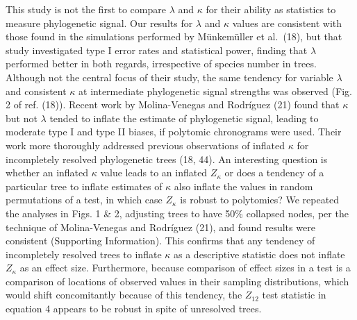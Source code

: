 \documentclass[9pt,twocolumn,twoside,lineno]{pnas-new}
\begin{document}
This study is not the first to compare \(\lambda\) and \(\kappa\) for
their ability as statistics to measure phylogenetic signal. Our results
for \(\lambda\) and \(\kappa\) values are consistent with those found in
the simulations performed by Münkemüller et al.~(18), but that study
investigated type I error rates and statistical power, finding that
\(\lambda\) performed better in both regards, irrespective of species
number in trees. Although not the central focus of their study, the same
tendency for variable \(\lambda\) and consistent \(\kappa\) at
intermediate phylogenetic signal strengths was observed (Fig. 2 of ref.
(18)). Recent work by Molina-Venegas and Rodríguez (21) found that
\(\kappa\) but not \(\lambda\) tended to inflate the estimate of
phylogenetic signal, leading to moderate type I and type II biases, if
polytomic chronograms were used. Their work more thoroughly addressed
previous observations of inflated \(\kappa\) for incompletely resolved
phylogenetic trees (18, 44). An interesting question is whether an
inflated \(\kappa\) value leads to an inflated \(Z_\kappa\) or does a
tendency of a particular tree to inflate estimates of \(\kappa\) also
inflate the values in random permutations of a test, in which case
\(Z_\kappa\) is robust to polytomies? We repeated the analyses in Figs.
1 \& 2, adjusting trees to have 50\% collapsed nodes, per the technique
of Molina-Venegas and Rodríguez (21), and found results were consistent
(Supporting Information). This confirms that any tendency of
incompletely resolved trees to inflate \(\kappa\) as a descriptive
statistic does not inflate \(Z_\kappa\) as an effect size. Furthermore,
because comparison of effect sizes in a test is a comparison of
locations of observed values in their sampling distributions, which
would shift concomitantly because of this tendency, the \(Z_{12}\) test
statistic in equation 4 appears to be robust in spite of unresolved
trees.
\end{document}
